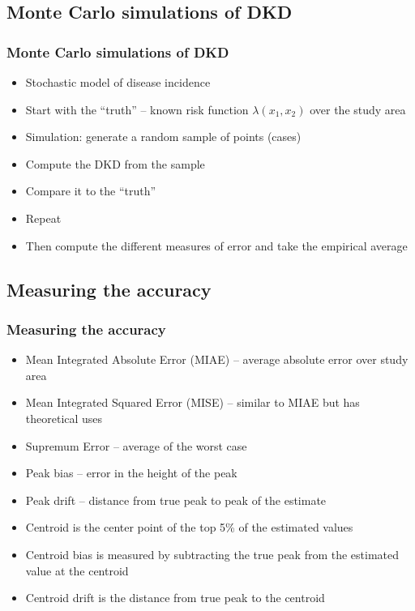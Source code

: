 \documentclass[notheorems]{beamer}
\theoremstyle{definition}
\theoremstyle{example}
\begin{document}
\subsection{Monte Carlo simulations of DKD}
\begin{frame}\frametitle{Monte Carlo simulations of DKD}
    \begin{itemize}
        \item Stochastic model of disease incidence
        \item Start with the ``truth'' -- known risk function $\lambda(x_1, x_2)$ over the study area
        \item Simulation: generate a random sample of points (cases)
        \item Compute the DKD from the sample
        \item Compare it to the ``truth''
        \item Repeat \textellipsis
        \item Then compute the different measures of error and take the empirical average
    \end{itemize}
\end{frame}

\subsection{Measuring the accuracy}
\begin{frame}\frametitle{Measuring the accuracy}
    \begin{itemize}
        \item Mean Integrated Absolute Error (MIAE) -- average absolute error over study area
        \item Mean Integrated Squared Error (MISE) -- similar to MIAE but has theoretical uses
        \item Supremum Error -- average of the worst case
        \item Peak bias -- error in the height of the peak
        \item Peak drift -- distance from true peak to peak of the estimate
        \item Centroid is the center point of the top 5\% of the estimated values
        \item Centroid bias is measured by subtracting the true peak from the estimated value at the centroid
        \item Centroid drift is the distance from true peak to the centroid
    \end{itemize}
\end{frame}
\end{document}
